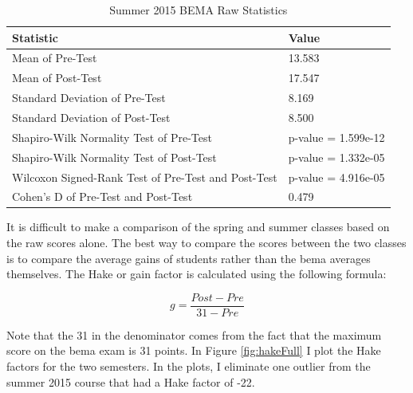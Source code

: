 \begin{small}
\begin{table}[h]
  \centering
  \begin{tabular}{|l|l|}
    \hline
    \textbf{Statistic} & \textbf{Value} \\
	\hline
	Mean of Pre-Test & 13.583 \\
	\hline
	Mean of Post-Test & 17.547 \\
	\hline
	Standard Deviation of Pre-Test & 8.169 \\
	\hline
	Standard Deviation of Post-Test & 8.500 \\
	\hline
	Shapiro-Wilk Normality Test of Pre-Test & p-value = 1.599e-12 \\
	\hline
	Shapiro-Wilk Normality Test of Post-Test & p-value = 1.332e-05 \\
	\hline
	Wilcoxon Signed-Rank Test of Pre-Test and Post-Test & p-value = 4.916e-05 \\
	\hline
	Cohen's D of Pre-Test and Post-Test & 0.479 \\
	\hline
  \end{tabular}
  \caption{Summer 2015 BEMA Raw Statistics}
  \label{tab:statsSu15}
\end{table}
\end{small}

It is difficult to make a comparison of the spring and summer classes based on the raw scores alone. The best way to compare the scores between the two classes is to compare the average gains of students rather than the \gls{bema} averages themselves. The Hake or gain factor is calculated using the following formula:

\begin{equation}
	g = \frac{Post - Pre}{31 - Pre}
\end{equation}

Note that the 31 in the denominator comes from the fact that the maximum score on the \gls{bema} exam is 31 points. In Figure \ref{fig:hakeFull} I plot the Hake factors for the two semesters. In the plots, I eliminate one outlier from the summer 2015 course that had a Hake factor of -22.

